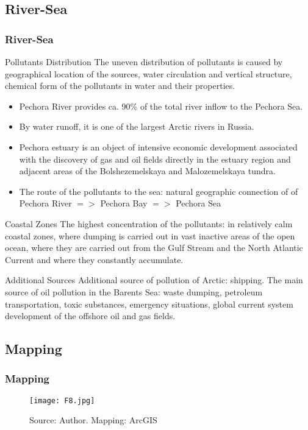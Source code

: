 \documentclass[pdflatex,compress,8pt,
	xcolor={dvipsnames,dvipsnames,svgnames,x11names,table},
	hyperref={	
	breaklinks = true, 
	pdfauthor={Lemenkova Polina}, 
	pdfsubject={Presentation}, 
	pdfcreator={Lemenkova Polina}, 
	pdfproducer={Lemenkova Polina}, 
	colorlinks=true,
	linkcolor=NavyBlue, 
	citecolor=NavyBlue, 
	urlcolor = NavyBlue, 
	breaklinks = true}]{beamer}
\begin{document}
\subsection{River-Sea}
\begin{frame}\frametitle{River-Sea}

\begin{alertblock}{Pollutants Distribution}
The uneven distribution of pollutants is caused by geographical location of the sources, water circulation and vertical structure, chemical form of the pollutants in water and their properties.
\end{alertblock}

\begin{itemize}
	\item Pechora River provides ca. 90\% of the total river inflow to the Pechora Sea.
	\item By water runoff, it is one of the largest Arctic rivers in Russia.
	\item Pechora estuary is an object of intensive economic development associated with the discovery of gas and oil fields directly in the estuary region and adjacent areas of the Bolshezemelskaya and Malozemelskaya tundra.
	\item The route of the pollutants to the sea: natural geographic connection of of Pechora River $=>$ Pechora Bay $=>$ Pechora Sea
\end{itemize}

\begin{block}{Coastal Zones}
The highest concentration of the pollutants: in relatively calm coastal zones, where dumping is carried out in vast inactive areas of the open ocean, where they are carried out from the Gulf Stream and the North Atlantic Current and where they constantly accumulate.
\end{block}

\begin{block}{Additional Sources}
Additional source of pollution of Arctic: shipping. The main source of oil pollution in the Barents Sea: waste dumping, petroleum transportation, toxic substances, emergency situations, global current system development of the offshore oil and gas fields.
\end{block}

\end{frame}

\subsection{Mapping}
\begin{frame}\frametitle{Mapping}
\vspace{2em}
\begin{figure}[H]
	\centering
		\texttt{[image: F8.jpg]}\caption{Source: Author. Mapping: ArcGIS}
\end{figure}
\end{frame}
\end{document}
